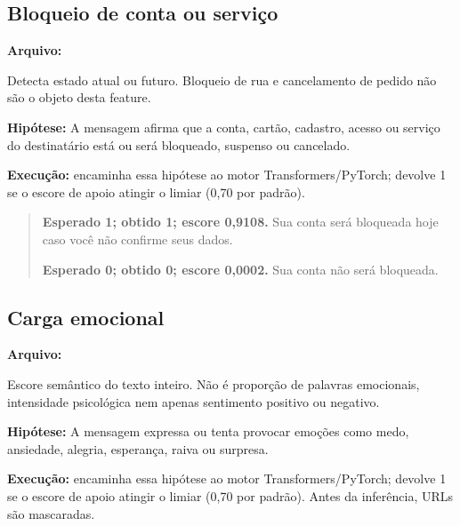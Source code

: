 \clearpage

\subsection{Bloqueio de conta ou serviço}

\textbf{Arquivo:} \par

Detecta estado atual ou futuro. Bloqueio de rua e cancelamento de pedido não são o objeto desta feature.

\textbf{Hipótese:} A mensagem afirma que a conta, cartão, cadastro, acesso ou serviço do destinatário está ou será bloqueado, suspenso ou cancelado.

\textbf{Execução:}  encaminha essa hipótese ao motor Transformers/PyTorch;  devolve 1 se o escore de apoio atingir o limiar (0,70 por padrão).

\begin{quote}\small

\textbf{Esperado 1; obtido 1; escore 0,9108.} Sua conta será bloqueada hoje caso você não confirme seus dados.\par

\textbf{Esperado 0; obtido 0; escore 0,0002.} Sua conta não será bloqueada.\par

\end{quote}

\subsection{Carga emocional}

\textbf{Arquivo:} \par

Escore semântico do texto inteiro. Não é proporção de palavras emocionais, intensidade psicológica nem apenas sentimento positivo ou negativo.

\textbf{Hipótese:} A mensagem expressa ou tenta provocar emoções como medo, ansiedade, alegria, esperança, raiva ou surpresa.

\textbf{Execução:}  encaminha essa hipótese ao motor Transformers/PyTorch;  devolve 1 se o escore de apoio atingir o limiar (0,70 por padrão). Antes da inferência, URLs são mascaradas.

